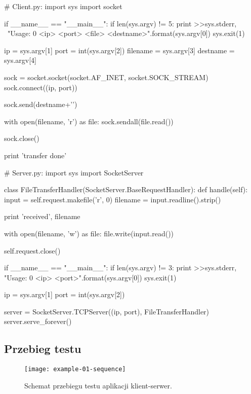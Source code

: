 \documentclass[00-praca-magisterska.tex]{subfiles}
\begin{document}
\begin{pythoncode}
  # Client.py:
  import sys
  import socket

  if __name__ == "__main__":
      if len(sys.argv) != 5:
	  print >>sys.stderr, \
	      "Usage: {0} <ip> <port> <file> <destname>".format(sys.argv[0])
	  sys.exit(1)

      ip = sys.argv[1]
      port = int(sys.argv[2])
      filename = sys.argv[3]
      destname = sys.argv[4]

      sock = socket.socket(socket.AF_INET, socket.SOCK_STREAM)
      sock.connect((ip, port))

      sock.send(destname+'\n')

      with open(filename, 'r') as file:
          sock.sendall(file.read())

      sock.close()

      print 'transfer done'

\end{pythoncode}

\begin{pythoncode}
  # Server.py:
  import sys
  import SocketServer

  class FileTransferHandler(SocketServer.BaseRequestHandler):
      def handle(self):
          input  = self.request.makefile('r', 0)
          filename = input.readline().strip()

          print 'received', filename

          with open(filename, 'w') as file:
	      file.write(input.read())
  
          self.request.close()

  if __name__ == "__main__":
      if len(sys.argv) != 3:
          print >>sys.stderr, "Usage: {0} <ip> <port>".format(sys.argv[0])
          sys.exit(1)

      ip = sys.argv[1]
      port = int(sys.argv[2])

      server = SocketServer.TCPServer((ip, port), FileTransferHandler)
      server.serve_forever()

\end{pythoncode}

\pagebreak

\subsection{Przebieg testu}

\begin{figure}[htb]
\begin{center}
\leavevmode
\texttt{[image: example-01-sequence]}
\end{center}
\caption{Schemat przebiegu testu aplikacji klient-serwer.}
\label{fig:example-01-sequence}
\end{figure}
\end{document}
